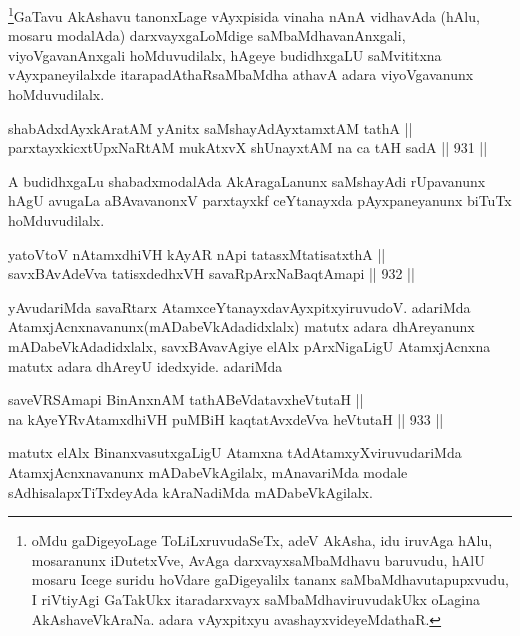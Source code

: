 \begin{artha}
\footnote{oMdu gaDigeyoLage ToLiLxruvudaSeTx, adeV AkAsha, idu iruvAga hAlu, mosaranunx iDutetxVve, AvAga darxvayxsaMbaMdhavu baruvudu, hAlU mosaru Icege suridu hoVdare gaDigeyalilx tananx saMbaMdhavutapupxvudu, I riVtiyAgi GaTakUkx itaradarxvayx saMbaMdhaviruvudakUkx oLagina AkAshaveVkAraNa. adara vAyxpitxyu avashayxvideyeMdathaR.}GaTavu AkAshavu tanonxLage vAyxpisida vinaha nAnA vidhavAda (hAlu, mosaru modalAda) darxvayxgaLoMdige saMbaMdhavanAnxgali, viyoVgavanAnxgali hoMduvudilalx, hAgeye budidhxgaLU saMvititxna vAyxpaneyilalxde itarapadAthaRsaMbaMdha athavA adara viyoVgavanunx hoMduvudilalx.
\end{artha}


\begin{shl}
shabAdxdAyxkAratAM yAnitx saMshayAdAyxtamxtAM tathA ||  \\
parxtayxkicxtUpxNaRtAM mukAtxvX shUnayxtAM na ca tAH sadA ||  931 ||  
\end{shl}

\begin{artha}
A budidhxgaLu shabadxmodalAda AkAragaLanunx saMshayAdi rUpavanunx hAgU avugaLa aBAvavanonxV parxtayxkf ceYtanayxda pAyxpaneyanunx biTuTx hoMduvudilalx.
\end{artha}


\begin{shl}
yatoV\s toV nA\s \s tamxdhiVH kAyAR nApi tatasxMtatisatxthA || \\
savxBAvAdeVva tatisxdedhxVH savaRpArxNaBaqtAmapi ||  932 ||  
\end{shl}

\begin{artha}
yAvudariMda savaRtarx AtamxceYtanayxdavAyxpitxyiruvudoV. adariMda AtamxjAcnxnavanunx(mADabeVkAdadidxlalx) matutx adara dhAreyanunx mADabeVkAdadidxlalx, savxBAvavAgiye elAlx pArxNigaLigU AtamxjAcnxna matutx adara dhAreyU idedxyide. adariMda
\end{artha}

\begin{shl}
saveVRSAmapi BinAnxnAM tathA\s BeVdatavxheVtutaH || \\
na kAyeYRvA\s \s tamxdhiVH puMBiH kaqtatAvxdeVva heVtutaH ||  933 ||  
\end{shl}

\begin{artha}
matutx elAlx BinanxvasutxgaLigU Atamxna tAdAtamxyXviruvudariMda AtamxjAcnxnavanunx mADabeVkAgilalx, mAnavariMda modale sAdhisalapxTiTxdeyAda kAraNadiMda mADabeVkAgilalx.
\end{artha}

